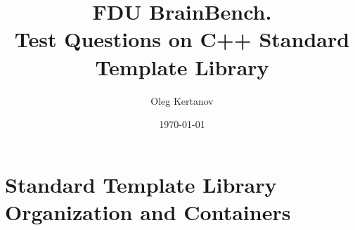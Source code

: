 \documentclass[11pt,a4paper]{article}
\begin{document}
\author{Oleg Kertanov}
\title{FDU BrainBench.\\ Test Questions on C++ Standard Template Library}
\date{\today}
\maketitle
\newpage
\tableofcontents

\newpage
\section{Standard Template Library Organization and Containers}
\end{document}

